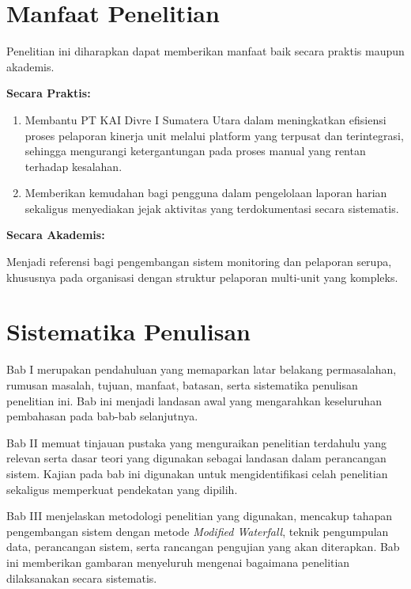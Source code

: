 \section{Manfaat Penelitian} \label{I.Manfaat}
Penelitian ini diharapkan dapat memberikan manfaat baik secara praktis maupun akademis.

\textbf{Secara Praktis:}
\begin{enumerate}[noitemsep]
    \item Membantu PT KAI Divre I Sumatera Utara dalam meningkatkan efisiensi proses pelaporan kinerja unit melalui platform yang terpusat dan terintegrasi, sehingga mengurangi ketergantungan pada proses manual yang rentan terhadap kesalahan.
    \item Memberikan kemudahan bagi pengguna dalam pengelolaan laporan harian sekaligus menyediakan jejak aktivitas yang terdokumentasi secara sistematis.
\end{enumerate}

\textbf{Secara Akademis:}
\par
Menjadi referensi bagi pengembangan sistem monitoring dan pelaporan serupa, khususnya pada organisasi dengan struktur pelaporan multi-unit yang kompleks.

\section{Sistematika Penulisan} \label{I.Sistematika}
Bab I merupakan pendahuluan yang memaparkan latar belakang permasalahan, rumusan masalah, tujuan, manfaat, batasan, serta sistematika penulisan penelitian ini. Bab ini menjadi landasan awal yang mengarahkan keseluruhan pembahasan pada bab-bab selanjutnya. \par

Bab II memuat tinjauan pustaka yang menguraikan penelitian terdahulu yang relevan serta dasar teori yang digunakan sebagai landasan dalam perancangan sistem. Kajian pada bab ini digunakan untuk mengidentifikasi celah penelitian sekaligus memperkuat pendekatan yang dipilih. \par

Bab III menjelaskan metodologi penelitian yang digunakan, mencakup tahapan pengembangan sistem dengan metode \textit{Modified Waterfall}, teknik pengumpulan data, perancangan sistem, serta rancangan pengujian yang akan diterapkan. Bab ini memberikan gambaran menyeluruh mengenai bagaimana penelitian dilaksanakan secara sistematis. \par

